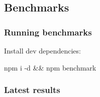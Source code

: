 \subsection*{Benchmarks}

\subsubsection*{Running benchmarks}

Install dev dependencies\+:


\begin{DoxyCode}
npm i -d && npm benchmark
\end{DoxyCode}


\subsubsection*{Latest results}


